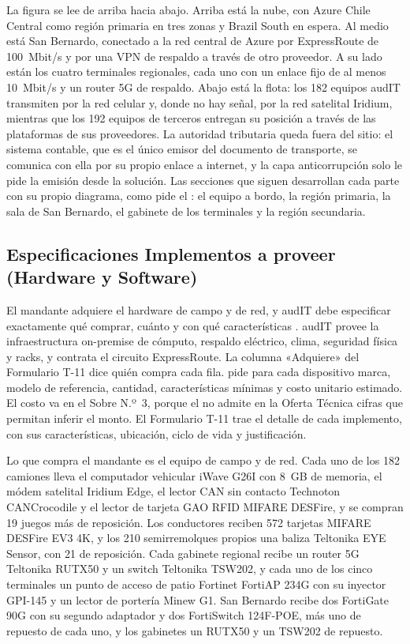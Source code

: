 La figura se lee de arriba hacia abajo. Arriba está la nube, con Azure Chile Central como región
primaria en tres zonas y Brazil South en espera. Al medio está San Bernardo, conectado a la red central
de Azure por ExpressRoute de 100~Mbit/s y por una VPN de respaldo a través de otro proveedor. A su
lado están los cuatro terminales regionales, cada uno con un enlace fijo de al menos 10~Mbit/s y un
router 5G de respaldo. Abajo está la flota: los 182 equipos audIT transmiten por la red celular y,
donde no hay señal, por la red satelital Iridium, mientras que los 192 equipos de terceros entregan su
posición a través de las plataformas de sus proveedores. La autoridad tributaria queda fuera del sitio:
el sistema contable, que es el único emisor del documento de transporte, se comunica con ella por su
propio enlace a internet, y la capa anticorrupción solo le pide la emisión desde la solución. Las secciones que siguen desarrollan cada
parte con su propio diagrama, como pide el : el equipo a bordo, la región
primaria, la sala de San Bernardo, el gabinete de los terminales y la región secundaria.

\subsection{Especificaciones Implementos a proveer (Hardware y Software)}\label{sec:4-implementos}

El mandante adquiere el hardware de campo y de red, y audIT debe especificar exactamente qué comprar,
cuánto y con qué características . audIT provee la infraestructura on-premise de
cómputo, respaldo eléctrico, clima, seguridad física y racks, y contrata el circuito ExpressRoute. La
columna «Adquiere» del Formulario T-11 dice quién compra cada fila.  pide para cada dispositivo marca,
modelo de referencia, cantidad, características mínimas y costo unitario estimado. El costo va en el
Sobre N.º~3, porque el  no admite en la Oferta Técnica cifras que permitan inferir el
monto. El Formulario T-11 trae el detalle de cada
implemento, con sus características, ubicación, ciclo de vida y justificación.

Lo que compra el mandante es el equipo de campo y de red. Cada uno de los 182 camiones lleva el
computador vehicular iWave G26I con 8~GB de memoria, el módem satelital Iridium Edge, el lector CAN sin
contacto Technoton CANCrocodile y el lector de tarjeta GAO RFID MIFARE DESFire, y se compran 19 juegos
más de reposición. Los conductores reciben 572 tarjetas MIFARE DESFire EV3 4K, y los 210 semirremolques
propios una baliza Teltonika EYE Sensor, con 21 de reposición. Cada gabinete regional recibe un router
5G Teltonika RUTX50 y un switch Teltonika TSW202, y cada uno de los cinco terminales un punto de acceso
de patio Fortinet FortiAP 234G con su inyector GPI-145 y un lector de portería Minew G1. San Bernardo
recibe dos FortiGate 90G con su segundo adaptador y dos FortiSwitch 124F-POE, más uno de repuesto de
cada uno, y los gabinetes un RUTX50 y un TSW202 de repuesto.

